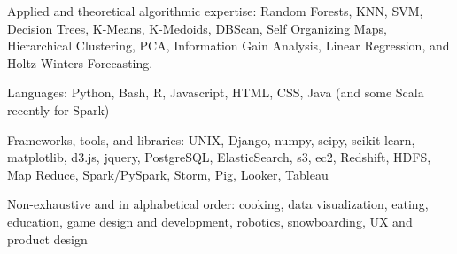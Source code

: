 \documentclass[10pt,a4paper]{article}
\begin{document}
\spacedhrule{0.5em}{-0.4em}


\inlineheadsection  %
  {Applied and theoretical algorithmic expertise:}
  {Random Forests, KNN, SVM, Decision Trees, K-Means, K-Medoids, DBScan, Self Organizing Maps, Hierarchical Clustering, PCA, Information Gain Analysis, Linear Regression, and Holtz-Winters Forecasting.}

\vspace{0.5em}
\inlineheadsection
  {Languages:}
  {Python, Bash, R, Javascript, HTML, CSS, Java (and some Scala recently for Spark)}

\vspace{0.5em}
\inlineheadsection
  {Frameworks, tools, and libraries:}
  {UNIX, Django, numpy, scipy, scikit-learn, matplotlib, d3.js, jquery, PostgreSQL, ElasticSearch, s3, ec2, Redshift, HDFS, Map Reduce, Spark/PySpark, Storm, Pig, Looker, Tableau}


\spacedhrule{1.6em}{-0.4em}


\inlineheadsection
  {Non-exhaustive and in alphabetical order:}
  {cooking, data visualization, eating, education, game design and development, robotics, snowboarding, UX and product design}
\end{document}
